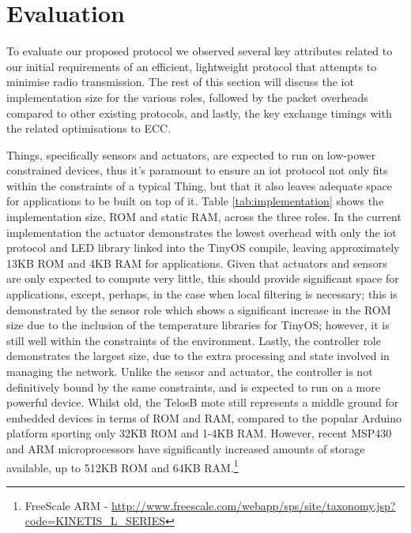 \documentclass[conference]{./sty/IEEEtran}
\begin{document}
\section{Evaluation} %
\label{sec:evaluation}
To evaluate our proposed protocol we observed several key attributes related to our initial requirements of an efficient, lightweight protocol that attempts to minimise radio transmission. The rest of this section will discuss the iot implementation size for the various roles, followed by the packet overheads compared to other existing protocols, and lastly, the key exchange timings with the related optimisations to ECC.

Things, specifically sensors and actuators, are expected to run on low-power constrained devices, thus it's paramount to ensure an iot protocol not only fits within the constraints of a typical Thing, but that it also leaves adequate space for applications to be built on top of it. Table \ref{tab:implementation} shows the implementation size, ROM and static RAM, across the three roles. In the current implementation the actuator demonstrates the lowest overhead with only the iot protocol and LED library linked into the TinyOS compile, leaving approximately 13KB ROM and 4KB RAM for applications. Given that actuators and sensors are only expected to compute very little, this should provide significant space for applications, except, perhaps, in the case when local filtering is necessary; this is demonstrated by the sensor role which shows a significant increase in the ROM size due to the inclusion of the temperature libraries for TinyOS; however, it is still well within the constraints of the environment. Lastly, the controller role demonstrates the largest size, due to the extra processing and state involved in managing the network. Unlike the sensor and actuator, the controller is not definitively bound by the same constraints, and is expected to run on a more powerful device. Whilst old, the TelosB mote still represents a middle ground for embedded devices in terms of ROM and RAM, compared to the popular Arduino platform sporting only 32KB ROM and 1-4KB RAM. However, recent MSP430 and ARM microprocessors have significantly increased amounts of storage available, up to 512KB ROM and 64KB RAM.\footnote{FreeScale ARM - \url{http://www.freescale.com/webapp/sps/site/taxonomy.jsp?code=KINETIS_L_SERIES}}
\end{document}
